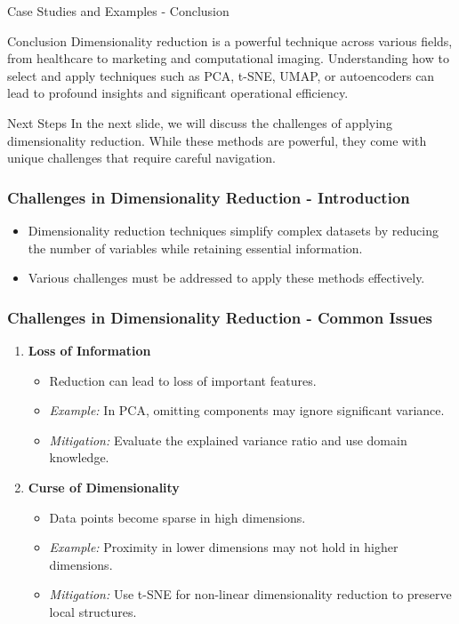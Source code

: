 \documentclass[aspectratio=169]{beamer}
\begin{document}
\begin{frame}[fragile]{Case Studies and Examples - Conclusion}
  \begin{block}{Conclusion}
    Dimensionality reduction is a powerful technique across various fields, from healthcare to marketing and computational imaging. 
    Understanding how to select and apply techniques such as PCA, t-SNE, UMAP, or autoencoders can lead to profound insights and significant operational efficiency.
  \end{block}

  \begin{block}{Next Steps}
    In the next slide, we will discuss the challenges of applying dimensionality reduction. While these methods are powerful, they come with unique challenges that require careful navigation.
  \end{block}
\end{frame}

\begin{frame}[fragile]
    \frametitle{Challenges in Dimensionality Reduction - Introduction}
    \begin{itemize}
        \item Dimensionality reduction techniques simplify complex datasets by reducing the number of variables while retaining essential information.
        \item Various challenges must be addressed to apply these methods effectively.
    \end{itemize}
\end{frame}

\begin{frame}[fragile]
    \frametitle{Challenges in Dimensionality Reduction - Common Issues}
    \begin{enumerate}
        \item \textbf{Loss of Information}
            \begin{itemize}
                \item Reduction can lead to loss of important features.
                \item \textit{Example:} In PCA, omitting components may ignore significant variance.
                \item \textit{Mitigation:} Evaluate the explained variance ratio and use domain knowledge.
            \end{itemize}
        
        \item \textbf{Curse of Dimensionality}
            \begin{itemize}
                \item Data points become sparse in high dimensions.
                \item \textit{Example:} Proximity in lower dimensions may not hold in higher dimensions.
                \item \textit{Mitigation:} Use t-SNE for non-linear dimensionality reduction to preserve local structures.
            \end{itemize}
    \end{enumerate}
\end{frame}
\end{document}

